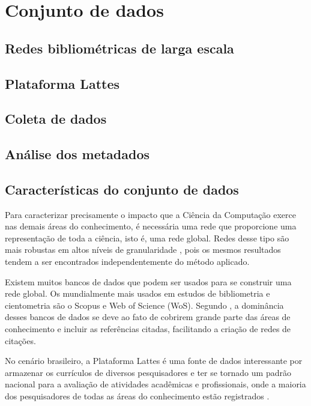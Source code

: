 \chapter{Conjunto de dados}

\section{Redes bibliométricas de larga escala}

\section{Plataforma Lattes}

\section{Coleta de dados}

\section{Análise dos metadados}

\section{Características do conjunto de dados}

Para caracterizar precisamente o impacto que a Ciência da Computação exerce nas demais áreas do conhecimento, é necessária uma rede que proporcione uma representação de toda a ciência, isto é, uma rede global. Redes desse tipo são mais robustas em altos níveis de granularidade \cite{boyack2019creation}, pois os mesmos resultados tendem a ser encontrados independentemente do método aplicado.

Existem muitos bancos de dados que podem ser usados para se construir uma rede global. Os mundialmente mais usados em estudos de bibliometria e cientometria são o Scopus e Web of Science (WoS). Segundo , a dominância desses bancos de dados se deve ao fato de cobrirem grande parte das áreas de conhecimento e incluir as referências citadas, facilitando a criação de redes de citações.

No cenário brasileiro, a Plataforma Lattes é uma fonte de dados interessante por armazenar os currículos de diversos pesquisadores e ter se tornado um padrão nacional para a avaliação de atividades acadêmicas e profissionais, onde a maioria dos pesquisadores de todas as áreas do conhecimento estão registrados \cite{mena2014brazilian}.

